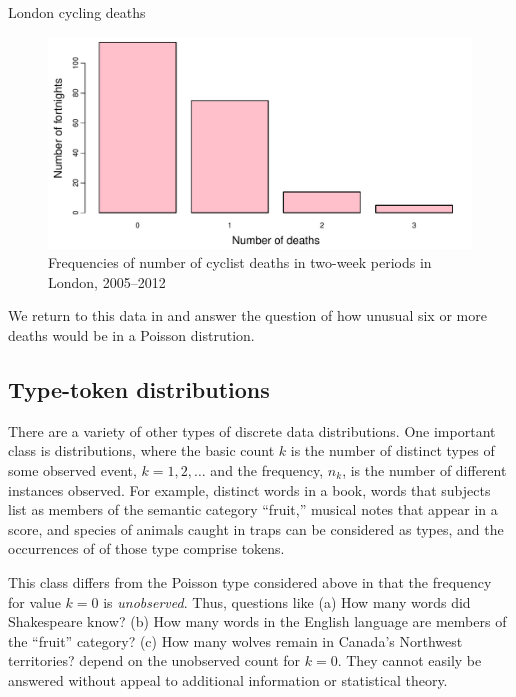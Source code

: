 \documentclass[11pt]{book}\usepackage[]{graphicx}\usepackage[]{color}
\newenvironment{knitrout}{}{} %
\renewenvironment{knitrout}{\small\renewcommand{\baselinestretch}{.85}}{} %
\begin{document}
\begin{Example}[cyclists1]{London cycling deaths}
\begin{knitrout}
\begin{figure}[htbp]
\centerline{\includegraphics[width=.75\textwidth]{ch03/fig/cyclists2} }

\caption[Frequencies of number of cyclist deaths in two-week periods in London, 2005--2012]{Frequencies of number of cyclist deaths in two-week periods in London, 2005--2012\label{fig:cyclists2}}
\end{figure}


\end{knitrout}

We return to this data in  and answer the question of
how unusual six or more deaths would be in a Poisson distrution.

\end{Example}

\subsection{Type-token distributions}\label{sec:type-token}

There are a variety of other types of discrete data distributions.
One important class is  distributions, where
the basic count $k$ is the number of distinct types of some observed
event, $k = 1, 2, \dots$ and the frequency, $n_k$, is the number of
different instances observed.  For example, distinct words in a book,
words that subjects list as members of the semantic category ``fruit,''
musical notes that appear in a score, and species of animals caught
in traps can be considered as types, and the occurrences of
of those type comprise tokens.  

This class differs from the Poisson type considered above
in that the frequency for value $k=0$ is \emph{unobserved}.  Thus, questions like
(a) How many words did Shakespeare know?
(b) How many words in the English language are members of the
``fruit'' category?
(c) How many wolves remain in Canada's Northwest territories?
depend on the unobserved count for $k=0$. They 
cannot easily be answered without appeal to additional information
or statistical theory.
\end{document}

